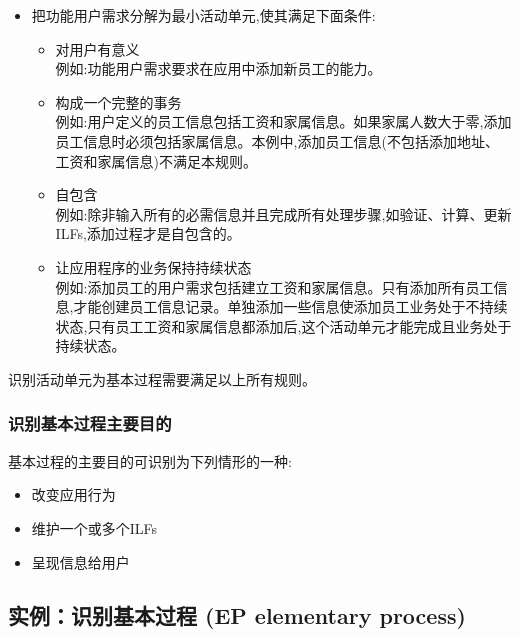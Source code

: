 \begin{itemize}
\tightlist
\item
  把功能用户需求分解为最小活动单元,使其满足下面条件:

  \begin{itemize}
  \tightlist
  \item
    对用户有意义\\
    例如:功能用户需求要求在应用中添加新员工的能力。\\
  \item
    构成一个完整的事务\\
    例如:用户定义的员工信息包括工资和家属信息。如果家属人数大于零,添加员工信息时必须包括家属信息。本例中,添加员工信息(不包括添加地址、工资和家属信息)不满足本规则。\\
  \item
    自包含\\
    例如:除非输入所有的必需信息并且完成所有处理步骤,如验证、计算、更新ILFs,添加过程才是自包含的。\\
  \item
    让应用程序的业务保持持续状态\\
    例如:添加员工的用户需求包括建立工资和家属信息。只有添加所有员工信息,才能创建员工信息记录。单独添加一些信息使添加员工业务处于不持续状态,只有员工工资和家属信息都添加后,这个活动单元才能完成且业务处于持续状态。\\
  \end{itemize}
\end{itemize}

识别活动单元为基本过程需要满足以上所有规则。\\

\hypertarget{ux8bc6ux522bux57faux672cux8fc7ux7a0bux4e3bux8981ux76eeux7684}{%
\subsubsection{识别基本过程主要目的}\label{ux8bc6ux522bux57faux672cux8fc7ux7a0bux4e3bux8981ux76eeux7684}}

基本过程的主要目的可识别为下列情形的一种:

\begin{itemize}
\tightlist
\item
  改变应用行为
\item
  维护一个或多个ILFs
\item
  呈现信息给用户
\end{itemize}

\hypertarget{ux5b9eux4f8bux8bc6ux522bux57faux672cux8fc7ux7a0b-ep-elementary-process}{%
\subsection{实例：识别基本过程 (EP elementary
process)}\label{ux5b9eux4f8bux8bc6ux522bux57faux672cux8fc7ux7a0b-ep-elementary-process}}

